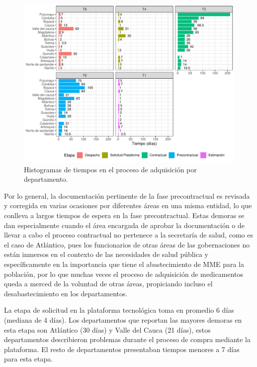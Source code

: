 \documentclass[
]{book}
\begin{document}
\begin{figure}[t]

{\centering \includegraphics[width=0.95\linewidth]{InformeFinal_files/figure-latex/EtapasProcesoAdquisicionDetalle-1} 

}

\caption{Histogramas de tiempos en el proceso de adquisición por departamento.}\label{fig:EtapasProcesoAdquisicionDetalle}
\end{figure}

Por lo general, la documentación pertinente de la fase precontractual es revisada y corregida en varias ocasiones por diferentes áreas en una misma entidad, lo que conlleva a largos tiempos de espera en la fase precontractual. Estas demoras se dan especialmente cuando el área encargada de aprobar la documentación o de llevar a cabo el proceso contractual no pertenece a la secretaría de salud, como es el caso de Atlántico, pues los funcionarios de otras áreas de las gobernaciones no están inmersos en el contexto de las necesidades de salud pública y específicamente en la importancia que tiene el abastecimiento de MME para la población, por lo que muchas veces el proceso de adquisición de medicamentos queda a merced de la voluntad de otras áreas, propiciando incluso el desabastecimiento en los departamentos.

La etapa de solicitud en la plataforma tecnológica toma en promedio 6 días (mediana de 4 días). Los departamentos que reportan las mayores demoras en esta etapa son Atlántico (30 días) y Valle del Cauca (21 días), estos departamentos describieron problemas durante el proceso de compra mediante la plataforma. El resto de departamentos presentaban tiempos menores a 7 días para esta etapa.
\end{document}
